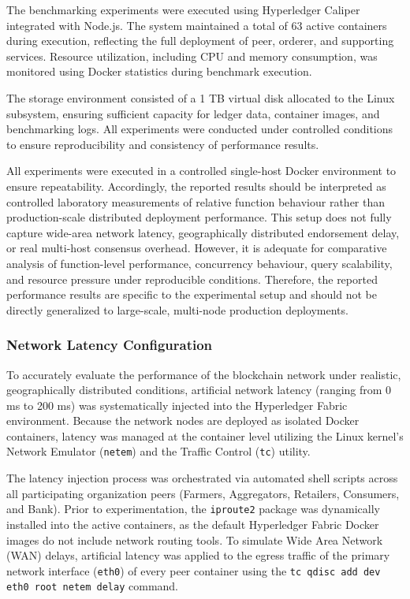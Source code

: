 \documentclass[12pt]{article}
\begin{document}
	
	
	The benchmarking experiments were executed using Hyperledger Caliper integrated with Node.js. The system maintained a total of 63 active containers during execution, reflecting the full deployment of peer, orderer, and supporting services. Resource utilization, including CPU and memory consumption, was monitored using Docker statistics during benchmark execution.
	
	The storage environment consisted of a 1 TB virtual disk allocated to the Linux subsystem, ensuring sufficient capacity for ledger data, container images, and benchmarking logs. All experiments were conducted under controlled conditions to ensure reproducibility and consistency of performance results.
	
	
	
	All experiments were executed in a controlled single-host Docker environment to ensure repeatability. Accordingly, the reported results should be interpreted as controlled laboratory measurements of relative function behaviour rather than production-scale distributed deployment performance. This setup does not fully capture wide-area network latency, geographically distributed endorsement delay, or real multi-host consensus overhead. However, it is adequate for comparative analysis of function-level performance, concurrency behaviour, query scalability, and resource pressure under reproducible conditions. Therefore, the reported performance results are specific to the experimental setup and should not be directly generalized to large-scale, multi-node production deployments.
	
	\subsubsection{Network Latency Configuration}
	
	To accurately evaluate the performance of the blockchain network under realistic, geographically distributed conditions, artificial network latency (ranging from 0 ms to 200 ms) was systematically injected into the Hyperledger Fabric environment. Because the network nodes are deployed as isolated Docker containers, latency was managed at the container level utilizing the Linux kernel's Network Emulator (\texttt{netem}) and the Traffic Control (\texttt{tc}) utility.

	The latency injection process was orchestrated via automated shell scripts across all participating organization peers (Farmers, Aggregators, Retailers, Consumers, and Bank). Prior to experimentation, the \texttt{iproute2} package was dynamically installed into the active containers, as the default Hyperledger Fabric Docker images do not include network routing tools. To simulate Wide Area Network (WAN) delays, artificial latency was applied to the egress traffic of the primary network interface (\texttt{eth0}) of every peer container using the \texttt{tc qdisc add dev eth0 root netem delay} command. 
	
\end{document}
